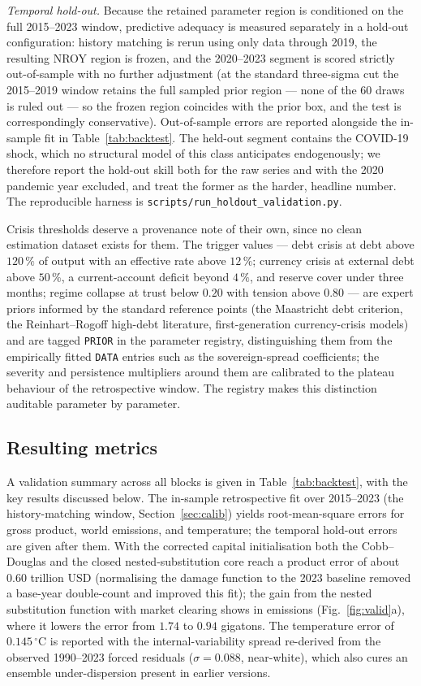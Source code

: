 \documentclass[a4paper,fleqn]{cas-sc}
\begin{document}
\emph{Temporal hold-out.} Because the retained parameter region is conditioned on the full
2015--2023 window, predictive adequacy is measured separately in a hold-out configuration:
history matching is rerun using only data through 2019, the resulting NROY region is
frozen, and the 2020--2023 segment is scored strictly out-of-sample with no further
adjustment (at the standard three-sigma cut the 2015--2019 window retains the full sampled
prior region --- none of the 60 draws is ruled out --- so the frozen region coincides with
the prior box, and the test is correspondingly conservative). Out-of-sample errors are
reported alongside the in-sample fit in Table~\ref{tab:backtest}. The held-out segment
contains the COVID-19 shock, which no structural model of this class anticipates
endogenously; we therefore report the hold-out skill both for the raw series and with the
2020 pandemic year excluded, and treat the former as the harder, headline number. The
reproducible harness is \texttt{scripts/run\_holdout\_validation.py}.

Crisis thresholds deserve a provenance note of their own, since no clean estimation dataset
exists for them. The trigger values --- debt crisis at debt above $120\,\%$ of output with an
effective rate above $12\,\%$; currency crisis at external debt above $50\,\%$, a
current-account deficit beyond $4\,\%$, and reserve cover under three months; regime collapse at
trust below $0.20$ with tension above $0.80$ --- are expert priors informed by the standard
reference points (the Maastricht debt criterion, the Reinhart--Rogoff high-debt literature,
first-generation currency-crisis models) and are tagged \texttt{PRIOR} in the parameter registry,
distinguishing them from the empirically fitted \texttt{DATA} entries such as the sovereign-spread
coefficients; the severity and persistence multipliers around them are calibrated to the
plateau behaviour of the retrospective window. The registry makes this distinction auditable
parameter by parameter.

\subsection{Resulting metrics}


A validation summary across all blocks is given in Table~\ref{tab:backtest}, with the key results
discussed below. The in-sample retrospective fit over 2015--2023 (the history-matching window,
Section~\ref{sec:calib}) yields root-mean-square errors for gross product, world emissions,
and temperature; the temporal hold-out errors are given after them. With the corrected capital initialisation both the
Cobb--Douglas and the closed nested-substitution core reach a product error of about $0.60$ trillion
USD (normalising the damage function to the 2023 baseline removed a base-year double-count and
improved this fit); the gain from the nested substitution function with market clearing shows in
emissions (Fig.~\ref{fig:valid}a), where it lowers the error from $1.74$ to $0.94$ gigatons. The
temperature error of $0.145\,^\circ$C is reported with the internal-variability spread re-derived
from the observed 1990--2023 forced residuals ($\sigma=0.088$, near-white), which also cures an
ensemble under-dispersion present in earlier versions.
\end{document}
